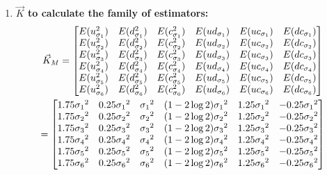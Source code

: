 \documentclass[12pt]{article}   	%
\begin{document}
\begin{enumerate}
\item \textbf{$\vec{K}$ to calculate the family of estimators:}\\
\begin{multline}
$$\vec{K}_{M}=
\begin{bmatrix}
E(u_{\sigma_1}^2)& E(d_{\sigma_1}^2)& E(c_{\sigma_1}^2)&E(ud_{\sigma_1})&E(uc_{\sigma_1})&E(dc_{\sigma_1})\\
E(u_{\sigma_2}^2)& E(d_{\sigma_2}^2)& E(c_{\sigma_2}^2)&E(ud_{\sigma_2})&E(uc_{\sigma_2})&E(dc_{\sigma_2})\\
E(u_{\sigma_3}^2)& E(d_{\sigma_3}^2)& E(c_{\sigma_3}^2)&E(ud_{\sigma_3})&E(uc_{\sigma_3})&E(dc_{\sigma_3})\\
E(u_{\sigma_4}^2)& E(d_{\sigma_4}^2)& E(c_{\sigma_4}^2)&E(ud_{\sigma_4})&E(uc_{\sigma_4})&E(dc_{\sigma_4})\\
E(u_{\sigma_5}^2)& E(d_{\sigma_5}^2)& E(c_{\sigma_5}^2)&E(ud_{\sigma_5})&E(uc_{\sigma_5})&E(dc_{\sigma_5})\\
E(u_{\sigma_6}^2)& E(d_{\sigma_6}^2)& E(c_{\sigma_6}^2)&E(ud_{\sigma_6})&E(uc_{\sigma_6})&E(dc_{\sigma_6})
\end{bmatrix}$$\\
$$=\begin{bmatrix}
1.75\sigma_1{^2} &0.25\sigma_1{^2}&\sigma_1{^2} & (1-2\log 2)\sigma_1{^2} &1.25\sigma_1{^2} &-0.25\sigma_1{^2}\\
1.75\sigma_2{^2} &0.25\sigma_2{^2}&\sigma_2{^2} & (1-2\log 2)\sigma_2{^2} &1.25\sigma_2{^2} &-0.25\sigma_2{^2}\\
1.75\sigma_3{^2} &0.25\sigma_3{^2}&\sigma_3{^2} & (1-2\log 2)\sigma_3{^2} &1.25\sigma_3{^2} &-0.25\sigma_3{^2}\\
1.75\sigma_4{^2} &0.25\sigma_4{^2}&\sigma_4{^2} & (1-2\log 2)\sigma_4{^2} &1.25\sigma_4{^2} &-0.25\sigma_4{^2}\\
1.75\sigma_5{^2} &0.25\sigma_5{^2}&\sigma_5{^2} & (1-2\log 2)\sigma_5{^2} &1.25\sigma_5{^2} &-0.25\sigma_5{^2}\\
1.75\sigma_6{^2} &0.25\sigma_6{^2}&\sigma_6{^2} & (1-2\log 2)\sigma_6{^2} &1.25\sigma_6{^2} &-0.25\sigma_6{^2}
\end{bmatrix}$$
\end{multline}


\end{enumerate}
\end{document}
